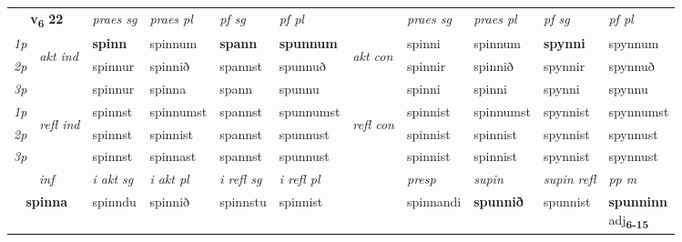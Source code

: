 \noindent
\begin{tabular}{lllllllllll} \toprule
\multicolumn{2}{c}{\textbf{v{\textsubscript{6}}} \Large{\textbf{22}}}  &  \textit{praes sg}  & \textit{praes pl}  &\textit{ pf sg} & \textit{pf pl} &  &  \textit{praes sg}  & \textit{praes pl}  & \textit{pf sg} & \textit{pf pl } \\*
	\cmidrule{3-6} \cmidrule{8-11}
 {\textit{1p}} & \multirow{3}{*}{\begin{turn}{90}\textit{akt ind}\end{turn}} & \textbf{spinn} & spinnum & \textbf{spann} & \textbf{spunnum} & \multirow{3}{*}{\begin{turn}{90}\textit{akt con}\end{turn}} &spinni & spinnum & \textbf{spynni} & spynnum\\*
 {\textit{2p}} &  &  spinnur  & spinnið & spannst & spunnuð & & spinnir & spinnið & spynnir & spynnuð \\*
{\textit{3p}} &  & spinnur & spinna & spann & spunnu & & spinni & spinni& spynni & spynnu \\*
\cmidrule{3-6} \cmidrule{8-11}
 {\textit{1p}} & \multirow{3}{*}{\begin{turn}{90}\textit{refl ind}\end{turn}}  & spinnst & spinnumst & spannst & spunnumst & \multirow{3}{*}{\begin{turn}{90}\textit{refl con}\end{turn}}  &spinnist & spinnumst & spynnist & spynnumst \\*
 {\textit{2p}} &  & spinnst & spinnist & spannst & spunnust & &spinnist & spinnist & spynnist & spynnust \\*
 {\textit{3p}}  & & spinnst & spinnast & spannst & spunnust & & spinnist & spinnist& spynnist & spynnust \\*
\cmidrule{3-6} \cmidrule{8-11}

   \multicolumn{2}{c}{\textit{inf}}  & \textit{i akt sg} & \textit{i akt pl} & \textit{i refl sg} & \textit{i refl pl} && \textit{presp} & \textit{supin} & \textit{supin refl} & \textit{pp m} \\*
  \multicolumn{2}{c}{\textbf{spinna}} & spinndu  & spinnið & spinnstu & spinnist && spinnandi &  \textbf{spunnið} & spunnist & \specialcell{\textbf{spunninn} \\ adj\textbf{\textsubscript{6-15}}} \\*
\end{tabular}

